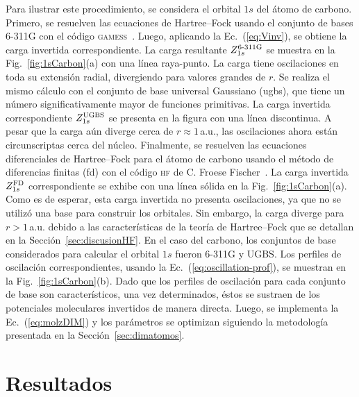 Para ilustrar este procedimiento, se considera el orbital $1s$ del átomo 
de carbono. Primero, se resuelven las ecuaciones de Hartree--Fock usando 
el conjunto de bases \mbox{6-311G} con el código 
\textsc{gamess}~\cite{Schmidt:93,Gordon:05}. Luego, aplicando la 
Ec.~(\ref{eq:Vinv}), se obtiene la carga invertida correspondiente. La 
carga resultante $Z_{1s}^{\mbox{\scriptsize 6-311G}}$ se muestra en la 
Fig.~\ref{fig:1sCarbon}(a) con una línea raya-punto. La carga tiene  
oscilaciones en toda su extensión radial, divergiendo para valores 
grandes de $r$. Se realiza el mismo cálculo con el conjunto de base 
universal Gaussiano (\acs{ugbs}), que tiene un número significativamente 
mayor de funciones primitivas. La carga invertida correspondiente 
$Z_{1s}^{\mbox{\scriptsize UGBS}}$ se presenta en la figura con una 
línea discontinua. A pesar que la carga aún diverge cerca de 
$r\approx1\,$a.u., las oscilaciones ahora están circunscriptas cerca del 
núcleo. Finalmente, se resuelven las ecuaciones diferenciales de 
Hartree--Fock para el átomo de carbono usando el método de diferencias 
finitas (\acs{fd}) con el código \textsc{hf} de C. Froese 
Fischer~\cite{FroeseFischer:97}. La carga invertida 
$Z_{1s}^{\mbox{\scriptsize FD}}$ correspondiente se 
exhibe con una línea sólida en la Fig.~\ref{fig:1sCarbon}(a). Como es de 
esperar, esta carga invertida no presenta oscilaciones, ya que no se 
utilizó una base para construir los orbitales. Sin embargo, la carga 
diverge para $r>1\,$a.u. debido a las características de la teoría de 
Hartree--Fock que se detallan en la Sección~\ref{sec:discusionHF}. En el 
caso del carbono, los conjuntos de base considerados para calcular el 
orbital $1s$ fueron \mbox{6-311G} y UGBS. Los perfiles de oscilación 
correspondientes, usando la Ec.~(\ref{eq:oscillation-prof}), se muestran 
en la Fig.~\ref{fig:1sCarbon}(b). Dado que los perfiles de oscilación 
para cada conjunto de base son característicos, una vez determinados, 
éstos se sustraen de los potenciales moleculares invertidos de manera 
directa. Luego, se implementa la Ec.~(\ref{eq:molzDIM}) y los parámetros 
se optimizan siguiendo la metodología presentada en la 
Sección~\ref{sec:dimatomos}.

\section{Resultados}
\label{sec:dimresultados}


